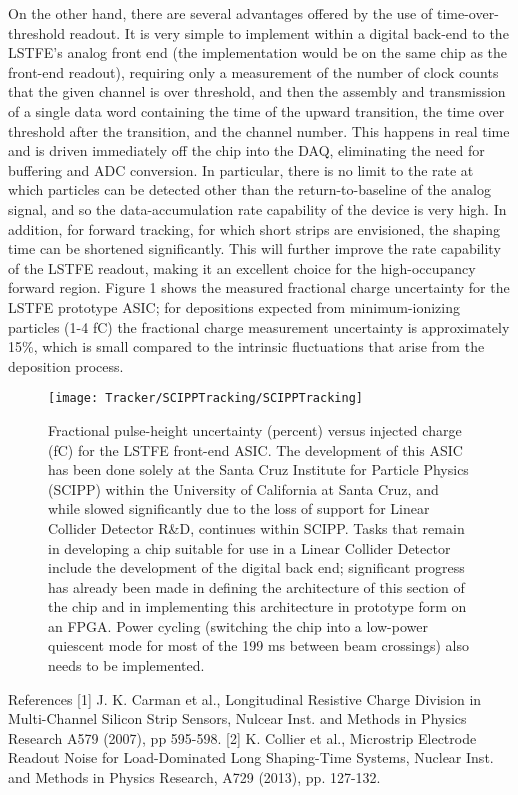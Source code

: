 On the other hand, there are several advantages offered by the use of time-over-threshold readout. It is very simple to implement within a digital back-end to the LSTFE’s analog front end (the implementation would be on the same chip as the front-end readout), requiring only a measurement of the number of clock counts that the given channel is over threshold, and then the assembly and transmission of a single data word containing the time of the upward transition, the time over threshold after the transition, and the channel number. This happens in real time and is driven immediately off the chip into the DAQ, eliminating the need for buffering and ADC conversion. In particular, there is no limit to the rate at which particles can be detected other than the return-to-baseline of the analog signal, and so the data-accumulation rate capability of the device is very high. In addition, for forward tracking, for which short strips are envisioned, the shaping time can be shortened significantly. This will further improve the rate capability of the LSTFE readout, making it an excellent choice for the high-occupancy forward region.
Figure 1 shows the measured fractional charge uncertainty for the LSTFE prototype ASIC; for depositions expected from minimum-ionizing particles (1-4 fC) the fractional charge measurement uncertainty is approximately 15\%, which is small compared to the intrinsic fluctuations that arise from the deposition process.
\begin{figure}
\texttt{[image: Tracker/SCIPPTracking/SCIPPTracking]}
\caption{Fractional pulse-height uncertainty (percent) versus injected charge (fC) for the LSTFE front-end ASIC.
The development of this ASIC has been done solely at the Santa Cruz Institute for Particle Physics (SCIPP) within the University of California at Santa Cruz, and while slowed significantly due to the loss of support for Linear Collider Detector R\&D, continues within SCIPP. Tasks that remain in developing a chip suitable for use in a Linear Collider Detector include the development of the digital back end; significant progress has already been made in defining the architecture of this section of the chip and in implementing this architecture in prototype form on an FPGA. Power cycling (switching the chip into a low-power quiescent mode for most of the 199 ms between beam crossings) also needs to be implemented.}
\end{figure}
 

References
[1] J. K. Carman et al., Longitudinal Resistive Charge Division in Multi-Channel Silicon Strip Sensors, Nulcear Inst. and Methods in Physics Research A579 (2007), pp 595-598.
[2] K. Collier et al., Microstrip Electrode Readout Noise for Load-Dominated Long Shaping-Time Systems, Nuclear Inst. and Methods in Physics Research, A729 (2013), pp. 127-132.
